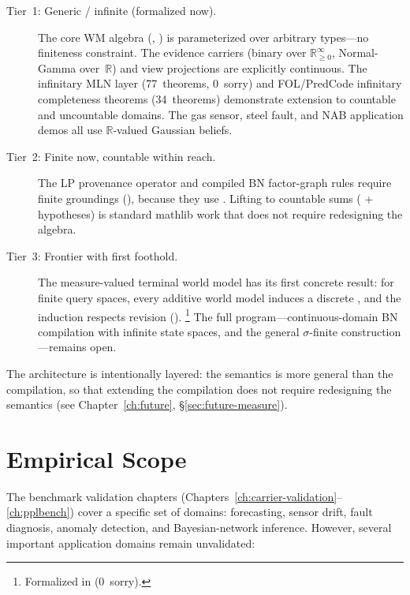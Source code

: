 \documentclass[11pt,openany]{report}
\begin{document}
\begin{description}
\item[Tier~1: Generic / infinite (formalized now).]
  The core WM algebra (,
  ) is parameterized over arbitrary types---no
  finiteness constraint.  The evidence carriers (binary over
  $\mathbb{R}_{\ge 0}^\infty$, Normal-Gamma over~$\mathbb{R}$)
  and view projections are explicitly continuous.  The infinitary
  MLN layer (77~theorems, 0~sorry) and FOL/PredCode infinitary
  completeness theorems (34~theorems) demonstrate extension to
  countable and uncountable domains.  The gas sensor, steel
  fault, and NAB application demos all use $\mathbb{R}$-valued
  Gaussian beliefs.

\item[Tier~2: Finite now, countable within reach.]
  The LP provenance operator and compiled BN factor-graph rules
  require finite groundings (), because they use
  .  Lifting to countable sums ( +
   hypotheses) is standard mathlib work that does
  not require redesigning the algebra.

\item[Tier~3: Frontier with first foothold.]
  The measure-valued terminal world model has its first concrete
  result: for finite query spaces, every additive world model
  induces a discrete , and the
  induction respects revision
  ().%
  \footnote{Formalized in
  (0~sorry).}
  The full program---continuous-domain BN compilation with
  infinite state spaces, and the general $\sigma$-finite
  construction---remains open.
\end{description}

\noindent
The architecture is intentionally layered: the semantics is more
general than the compilation, so that extending the compilation
does not require redesigning the semantics
(see Chapter~\ref{ch:future}, \S\ref{sec:future-measure}).

\section{Empirical Scope}

The benchmark validation chapters
(Chapters~\ref{ch:carrier-validation}--\ref{ch:pplbench}) cover a
specific set of domains: forecasting, sensor drift, fault diagnosis,
anomaly detection, and Bayesian-network inference.  However, several
important application domains remain unvalidated:
\end{document}
